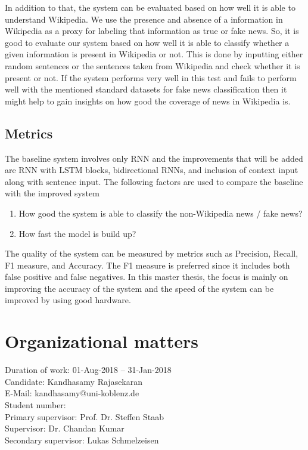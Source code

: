 \documentclass[a4paper, 11pt]{article}
\makeatletter
\newcommand{\myName}{Kandhasamy Rajasekaran}
\newcommand{\emailID}{kandhasamy@uni-koblenz.de}
\newcommand{\matriculationID}{216100855}
\newcommand{\StartDate}{01-Aug-2018}
\newcommand{\EndDate}{31-Jan-2018}
\newcommand{\expert}{Prof. Dr. Steffen Staab}%
\newcommand{\supervisor}{Dr. Chandan Kumar} %
\newcommand{\secondSupervisor}{Lukas Schmelzeisen} %
\makeatother
\begin{document}
In addition to that, the system can be evaluated based on how well it is able to understand Wikipedia. We use the presence and absence of a information in Wikipedia as a proxy for labeling that information as true or fake news. So, it is good to evaluate our system based on how well it is able to classify whether a given information is present in Wikipedia or not. This is done by inputting either random sentences or the sentences taken from Wikipedia and check whether it is present or not. \color{red}If the system performs very well in this test and fails to perform well with the mentioned standard datasets for fake news classification then it might help to gain insights on how good the coverage of news in Wikipedia is. \color{black}

\subsection{Metrics}

The baseline system involves only RNN and the improvements that will be added are RNN with LSTM blocks, bidirectional RNNs, and inclusion of context input along with sentence input. The following factors are used to compare the baseline with the improved system
\begin{enumerate}
\item How good the system is able to classify the non-Wikipedia news / fake news?
\item How fast the model is build up?
\end{enumerate}

The quality of the system can be measured by metrics such as Precision, Recall, F1 measure, and Accuracy. The F1 measure is preferred since it includes both false positive and false negatives. In this master thesis, the focus is mainly on improving the accuracy of the system and the speed of the system can be improved by using good hardware.

\newpage

\section{Organizational matters}

\begin{tabbing}
Duration of work: \hspace{1.1cm} \= \StartDate{} -- \EndDate{}\\
\vspace{0.5ex}Candidate:	\> \myName{}\\
\vspace{0.5ex}E-Mail:	\> \emailID{}\\
\vspace{0.5ex}Student number: \> \matriculationID{}\\
\vspace{0.5ex}Primary supervisor: \> \expert{}\\
Supervisor: \> \supervisor{}\\
Secondary supervisor: \> \secondSupervisor{}\\
\end{tabbing}
\end{document}
